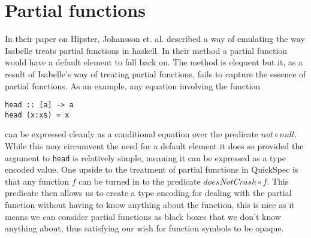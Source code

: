 \section{Partial functions}
In their paper on Hipster, Johansson et. al. \cite{Johansson2014}
described a way of emulating the way Isabelle treats partial
functions in haskell. In their method a partial function would
have a default element to fall back on. The method is
elequent but it, as a result of Isabelle's
way of treating partial functions,
fails to capture the essence of partial functions.
As an example, any equation involving the function
\begin{verbatim}head :: [a] -> a
head (x:xs) = x
\end{verbatim}
can be expressed cleanly as a conditional equation
over the predicate $not\circ null$.
While this may circumvent the need for
a default element it does so provided the
argument to \texttt{head} is relatively simple,
meaning it can be expressed as a type encoded value.
One upside to the treatment of partial functions in QuickSpec
is that any function $f$ can be turned in to the predicate
$doesNotCrash \circ f$. This predicate then allows us to create
a type encoding for dealing with the partial function without
having to know anything about the function, this is nice as it means
we can consider partial functions as black boxes that we don't know
anything about, thus satisfying our wish for function symbols to be opaque.
